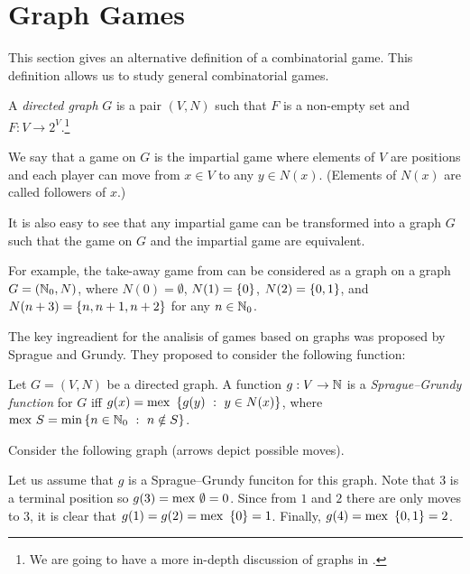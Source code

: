 \chapter{Graph Games}
This section gives an alternative definition of a combinatorial game.
This definition allows us to study general combinatorial games.
\begin{definition}
  A \emph{directed graph} $G$ is a pair $(V, N)$ such that $F$ is a non-empty
  set and $F : V \to 2^V$.\footnote{%
    We are going to have a more in-depth
    discussion of graphs in .
  }

  We say that a game on $G$ is the impartial game where elements of $V$ are
  positions and each player can move from $x \in V$ to any $y \in N(x)$.
  (Elements of $N(x)$ are called followers of $x$.)
\end{definition}

\begin{remark}
  It is also easy to see that any impartial game can be transformed into a graph
  $G$ such that the game on $G$ and the impartial game are equivalent.
\end{remark}

For example, the take-away game from 
can be considered as a graph on a graph $G = ({\mathbb{N}}_0, N)$,
where $N(0) = \emptyset$, $N(1) = \set{0}$, $N(2) = \set{0, 1}$, and
$N(n + 3) = \set{n, n + 1, n + 2}$ for any $n \in {\mathbb{N}}_0$.

The key ingreadient for the analisis of games based on graphs was proposed
by Sprague and Grundy. They proposed to consider the following function:
\begin{definition}
  Let $G = (V, N)$ be a directed graph. A function $g : V \to {\mathbb{N}}$ is a
  \emph{Sprague--Grundy function} for $G$ iff
  $g(x) = \mex\set[y \in N(x)]{g(y)}$, where
  $\mex S = \min \set[n \notin S]{n \in \N_0}$.
\end{definition}


Consider the following graph (arrows depict possible moves).
\begin{center}
\end{center}
Let us assume that $g$ is a Sprague--Grundy funciton for this graph.
Note that $3$ is a terminal position so $g(3) = \mathrm{mex}~ \emptyset = 0$.
Since from $1$ and $2$ there are only moves to $3$, it is clear that
$g(1) = g(2) = \mex \set{0} = 1$. Finally, $g(4) = \mex \set{0, 1} = 2$.

